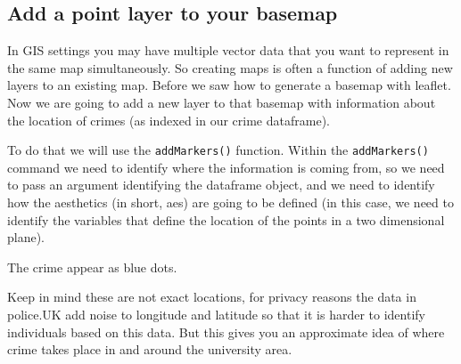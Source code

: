 \documentclass[]{book}
\newenvironment{Shaded}{\begin{snugshade}}{\end{snugshade}}
\newcommand{\CommentTok}[1]{\textcolor[rgb]{0.56,0.35,0.01}{\textit{#1}}}
\newcommand{\DataTypeTok}[1]{\textcolor[rgb]{0.13,0.29,0.53}{#1}}
\newcommand{\DecValTok}[1]{\textcolor[rgb]{0.00,0.00,0.81}{#1}}
\newcommand{\FloatTok}[1]{\textcolor[rgb]{0.00,0.00,0.81}{#1}}
\newcommand{\KeywordTok}[1]{\textcolor[rgb]{0.13,0.29,0.53}{\textbf{#1}}}
\newcommand{\NormalTok}[1]{#1}
\newcommand{\OperatorTok}[1]{\textcolor[rgb]{0.81,0.36,0.00}{\textbf{#1}}}
\newcommand{\StringTok}[1]{\textcolor[rgb]{0.31,0.60,0.02}{#1}}
\begin{document}
\hypertarget{add-a-point-layer-to-your-basemap}{%
\subsection{Add a point layer to your basemap}\label{add-a-point-layer-to-your-basemap}}

In GIS settings you may have multiple vector data that you want to represent in the same map simultaneously. So creating maps is often a function of adding new layers to an existing map. Before we saw how to generate a basemap with leaflet. Now we are going to add a new layer to that basemap with information about the location of crimes (as indexed in our crime dataframe).

To do that we will use the \texttt{addMarkers()} function. Within the \texttt{addMarkers()} command we need to identify where the information is coming from, so we need to pass an argument identifying the dataframe object, and we need to identify how the aesthetics (in short, aes) are going to be defined (in this case, we need to identify the variables that define the location of the points in a two dimensional plane).

\begin{Shaded}
\end{Shaded}

\hypertarget{htmlwidget-1b4b2d7b104d99b2da5a}{}

The crime appear as blue dots.

Keep in mind these are not exact locations, for privacy reasons the data in police.UK add noise to longitude and latitude so that it is harder to identify individuals based on this data. But this gives you an approximate idea of where crime takes place in and around the university area.
\end{document}
